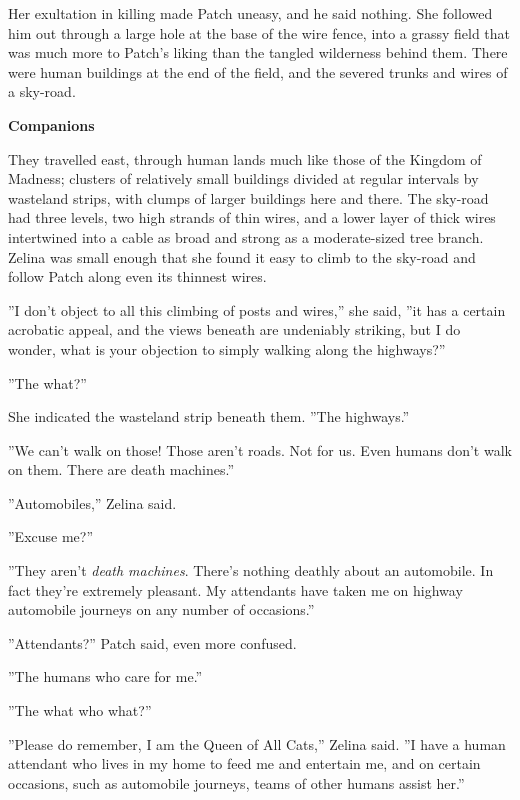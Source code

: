\documentclass[11pt]{article}
\begin{document}
Her exultation in killing made Patch uneasy, and he said nothing. She followed him out through a large hole at the base of the wire fence, into a grassy field that was much more to Patch's liking than the tangled wilderness behind them. There were human buildings at the end of the field, and the severed trunks and wires of a sky-road.\par
\par
{\bf Companions\par
}\par
 They travelled east, through human lands much like those of the Kingdom of Madness; clusters of relatively small buildings divided at regular intervals by wasteland strips, with clumps of larger buildings here and there. The sky-road had three levels, two high strands of thin wires, and a lower layer of thick wires intertwined into a cable as broad and strong as a moderate-sized tree branch. Zelina was small enough that she found it easy to climb to the sky-road and follow Patch along even its thinnest wires.\par
 ''I don't object to all this climbing of posts and wires,'' she said, ''it has a certain acrobatic appeal, and the views beneath are undeniably striking, but I do wonder, what is your objection to simply walking along the highways?''\par
 ''The what?''\par
 She indicated the wasteland strip beneath them. ''The highways.''\par
 ''We can't walk on those! Those aren't roads. Not for us. Even humans don't walk on them. There are death machines.''\par
 ''Automobiles,'' Zelina said.\par
 ''Excuse me?''\par
 ''They aren't {\it death machines}. There's nothing deathly about an automobile. In fact they're extremely pleasant. My attendants have taken me on highway automobile journeys on any number of occasions.''\par
 ''Attendants?'' Patch said, even more confused.\par
 ''The humans who care for me.''\par
 ''The what who what?''\par
 ''Please do remember, I am the Queen of All Cats,'' Zelina said. ''I have a human attendant who lives in my home to feed me and entertain me, and on certain occasions, such as automobile journeys, teams of other humans assist her.''\par
\end{document}
